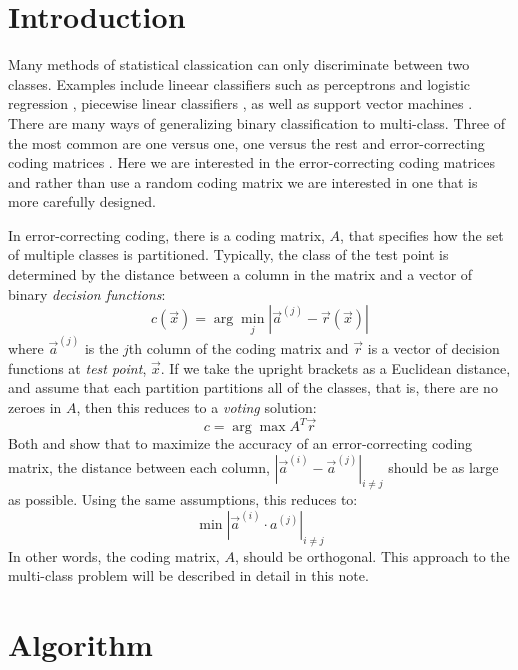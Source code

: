 
\section{Introduction}

Many methods of statistical classication can only discriminate between two classes. 
Examples include lineear classifiers such as perceptrons and logistic regression \citep{Michie_etal1994}, 
piecewise linear classifiers \citep{Herman_Yeung1992,Mills2011},
as well as support vector machines \citep{kernel_intro}.
There are many ways of generalizing binary classification to 
multi-class.
Three of the most common are one versus one, one versus the rest and 
error-correcting coding matrices \citep{Hsu_Lin2002}.
Here we are interested in the error-correcting coding matrices
\citep{Dietterich_Bakiri1995, Windeatt_Ghaderi2002} and
rather than use a random coding matrix we are interested in one that is
more carefully designed.

In error-correcting coding, there is a coding matrix, $A$, that specifies
how the set of multiple classes is partitioned.
Typically, the class of the test point is determined by the distance between
a column in the matrix and a vector of binary {\it decision functions}:
\begin{equation}
	c(\vec x) = \arg \min_j | \vec a^{(j)} - \vec r(\vec x) |
\end{equation}
where $\vec a^{(j)}$ is the $j$th column of the coding matrix and $\vec r$
is a vector of decision functions at {\it test point}, $\vec x$.
If we take the upright brackets as a Euclidean distance, and assume that
each partition partitions all of the classes, that is, there are no zeroes
in $A$, then this reduces to a {\it voting} solution:
\begin{equation}
	c = \arg \max A^T \vec r \label{voting}
\end{equation}
Both \citet{Allwein_etal2000} and \citet{Windeatt_Ghaderi2002} show that to
maximize the accuracy of an error-correcting coding matrix, the distance
between each column, $|\vec a^{(i)} - \vec a^{(j)}|_{i \ne j}$ should be as
large as possible.
Using the same assumptions, this reduces to:
\begin{equation}
	\min |\vec a^{(i)} \cdot a^{(j)}|_{i \ne j}
\end{equation}
In other words, the coding matrix, $A$, should be orthogonal.
This approach to the multi-class problem will be described in detail in this note.

\section{Algorithm}

